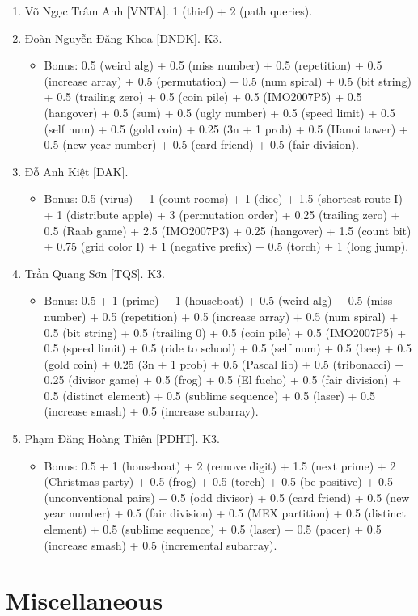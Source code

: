 \documentclass{article}
\begin{document}
\begin{enumerate}
	\item {\sc Võ Ngọc Trâm Anh [VNTA].} 1 (thief) + 2 (path queries).
    \item {\sc Đoàn Nguyễn Đăng Khoa [DNDK].} K3.
    \begin{itemize}
        \item Bonus: 0.5 (weird alg) + 0.5 (miss number) + 0.5 (repetition) + 0.5 (increase array) + 0.5 (permutation) + 0.5 (num spiral) + 0.5 (bit string) + 0.5 (trailing zero) + 0.5 (coin pile) + 0.5 (IMO2007P5) + 0.5 (hangover) + 0.5 (sum) + 0.5 (ugly number) + 0.5 (speed limit) + 0.5 (self num) + 0.5 (gold coin) + 0.25 (3n + 1 prob) + 0.5 (Hanoi tower) + 0.5 (new year number) + 0.5 (card friend) + 0.5 (fair division).
    \end{itemize}
	\item {\sc Đỗ Anh Kiệt [DAK].}
	\begin{itemize}
		\item Bonus: 0.5 (virus) + 1 (count rooms) + 1 (dice) + 1.5 (shortest route I)  + 1 (distribute apple) + 3 (permutation order) + 0.25 (trailing zero) + 0.5 (Raab game) + 2.5 (IMO2007P3) + 0.25 (hangover) + 1.5 (count bit) + 0.75 (grid color I) + 1 (negative prefix) + 0.5 (torch) + 1 (long jump).
	\end{itemize}
	\item {\sc Trần Quang Sơn [TQS].} K3.
	\begin{itemize}
		\item Bonus: 0.5 + 1 (prime) + 1 (houseboat) + 0.5 (weird alg) + 0.5 (miss number) + 0.5 (repetition) + 0.5 (increase array) + 0.5 (num spiral) + 0.5 (bit string) + 0.5 (trailing 0) + 0.5 (coin pile) + 0.5 (IMO2007P5) + 0.5 (speed limit) + 0.5 (ride to school) + 0.5 (self num) + 0.5 (bee) + 0.5 (gold coin) + 0.25 (3n + 1 prob) + 0.5 (Pascal lib) + 0.5 (tribonacci) + 0.25 (divisor game) + 0.5 (frog) + 0.5 (El fucho) + 0.5 (fair division) + 0.5 (distinct element) + 0.5 (sublime sequence) + 0.5 (laser) + 0.5 (increase smash) + 0.5 (increase subarray).
	\end{itemize}
	\item {\sc Phạm Đăng Hoàng Thiên [PDHT].} K3.
		\begin{itemize}
		\item Bonus: 0.5 + 1 (houseboat) + 2 (remove digit) + 1.5 (next prime) + 2 (Christmas party) + 0.5 (frog) + 0.5 (torch) + 0.5 (be positive) + 0.5 (unconventional pairs) + 0.5 (odd divisor) + 0.5 (card friend) + 0.5 (new year number) + 0.5 (fair division) + 0.5 (MEX partition) + 0.5 (distinct element) + 0.5 (sublime sequence) + 0.5 (laser) + 0.5 (pacer) + 0.5 (increase smash) + 0.5 (incremental subarray).
	\end{itemize}
\end{enumerate}


\section{Miscellaneous}


\printbibliography[heading=bibintoc]
\end{document}
